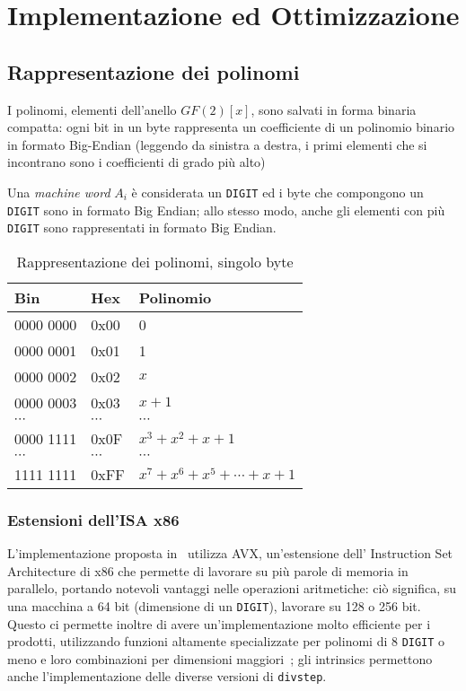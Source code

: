 \section{Implementazione ed Ottimizzazione}\label{impl}
\subsection*{\textbf{Rappresentazione dei polinomi}}
I polinomi, elementi dell'anello $GF(2)[x]$, sono salvati in forma binaria compatta: ogni bit in un byte rappresenta un 
coefficiente di un polinomio binario in formato Big-Endian (leggendo da sinistra a destra, i primi elementi che
si incontrano sono i coefficienti di grado più alto)

Una \textit{machine word} $A_i$ è considerata un \texttt{DIGIT} ed i byte che
compongono un \texttt{DIGIT} sono in formato Big Endian; allo stesso modo, 
anche gli elementi con più \texttt{DIGIT} sono rappresentati in 
formato Big Endian.
\begin{table}
    \begin{tabular}{lll}
    Bin & Hex & Polinomio \\
    \hline
    0000 0000 & 0x00 & 0 \\
    0000 0001 & 0x01 & 1 \\
    0000 0002 & 0x02 & $x$ \\
    0000 0003 & 0x03 & $x+1$ \\
    $\cdots$ & $\cdots$ & $\cdots$ \\
    0000 1111 & 0x0F & $x^3+x^2+x+1$ \\
    $\cdots$ & $\cdots$ & $\cdots$ \\
    1111 1111 & 0xFF & $x^7+x^6+x^5+\cdots+x+1$ \\
    \end{tabular}
    \caption{Rappresentazione dei polinomi, singolo byte}
\end{table}
\subsubsection*{Estensioni dell'ISA x86}
L'implementazione proposta in~\cite{benchmark} utilizza AVX, un'estensione 
dell' Instruction Set Architecture di x86 che permette di lavorare su più parole di memoria
in parallelo, portando notevoli vantaggi nelle operazioni aritmetiche: ciò significa,
su una macchina a 64 bit (dimensione di un \texttt{DIGIT}), lavorare su 128 o 256 bit.
Questo ci permette inoltre di avere un'implementazione molto efficiente per i prodotti, utilizzando funzioni
altamente specializzate per polinomi di 8 \texttt{DIGIT} o meno e loro combinazioni per dimensioni
maggiori~\cite{bodrato2007towards}; gli intrinsics permettono anche l'implementazione delle diverse versioni di
\texttt{divstep}.



